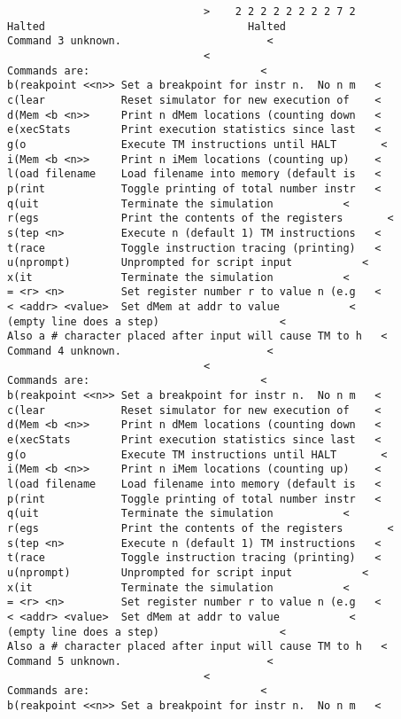 \documentclass[12pt]{book}
\begin{document}
\begin{lstlisting}
                               >    2 2 2 2 2 2 2 2 7 2 
Halted                                Halted
Command 3 unknown.                       <
                               <
Commands are:                           <
b(reakpoint <<n>> Set a breakpoint for instr n.  No n m   <
c(lear            Reset simulator for new execution of    <
d(Mem <b <n>>     Print n dMem locations (counting down   <
e(xecStats        Print execution statistics since last   <
g(o               Execute TM instructions until HALT       <
i(Mem <b <n>>     Print n iMem locations (counting up)    <
l(oad filename    Load filename into memory (default is   <
p(rint            Toggle printing of total number instr   <
q(uit             Terminate the simulation           <
r(egs             Print the contents of the registers       <
s(tep <n>         Execute n (default 1) TM instructions   <
t(race            Toggle instruction tracing (printing)   <
u(nprompt)        Unprompted for script input           <
x(it              Terminate the simulation           <
= <r> <n>         Set register number r to value n (e.g   <
< <addr> <value>  Set dMem at addr to value           <
(empty line does a step)                   <
Also a # character placed after input will cause TM to h   <
Command 4 unknown.                       <
                               <
Commands are:                           <
b(reakpoint <<n>> Set a breakpoint for instr n.  No n m   <
c(lear            Reset simulator for new execution of    <
d(Mem <b <n>>     Print n dMem locations (counting down   <
e(xecStats        Print execution statistics since last   <
g(o               Execute TM instructions until HALT       <
i(Mem <b <n>>     Print n iMem locations (counting up)    <
l(oad filename    Load filename into memory (default is   <
p(rint            Toggle printing of total number instr   <
q(uit             Terminate the simulation           <
r(egs             Print the contents of the registers       <
s(tep <n>         Execute n (default 1) TM instructions   <
t(race            Toggle instruction tracing (printing)   <
u(nprompt)        Unprompted for script input           <
x(it              Terminate the simulation           <
= <r> <n>         Set register number r to value n (e.g   <
< <addr> <value>  Set dMem at addr to value           <
(empty line does a step)                   <
Also a # character placed after input will cause TM to h   <
Command 5 unknown.                       <
                               <
Commands are:                           <
b(reakpoint <<n>> Set a breakpoint for instr n.  No n m   <

\end{lstlisting}
\end{document}
